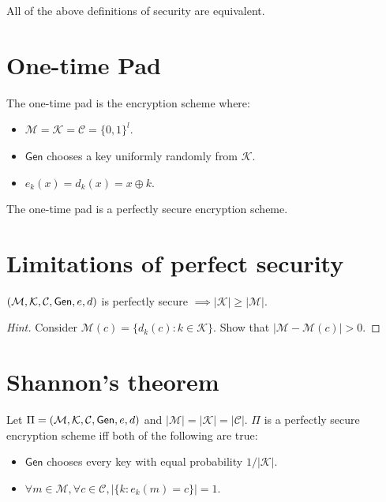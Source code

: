 \begin{theorem}All of the above definitions of security are equivalent.\end{theorem}

\section{One-time Pad}

The one-time pad is the encryption scheme where:
\begin{itemize}
\item $\mathcal{M} = \mathcal{K} = \mathcal{C} = \{0, 1\}^l$.
\item $\textsf{Gen}$ chooses a key uniformly randomly from $\mathcal{K}$.
\item $e_k(x) = d_k(x) = x \oplus k$.
\end{itemize}

\begin{theorem}The one-time pad is a perfectly secure encryption scheme.\end{theorem}

\section{Limitations of perfect security}

\begin{theorem}$(\mathcal{M}, \mathcal{K}, \mathcal{C}, \textsf{Gen}, e, d)$
is perfectly secure $\implies |\mathcal{K}| \ge |\mathcal{M}|$.\end{theorem}
\begin{proof}[Hint]Consider $\mathcal{M}(c) = \{d_k(c): k \in \mathcal{K}\}$.
Show that $|\mathcal{M} - \mathcal{M}(c)| > 0$.\end{proof}

\section{Shannon's theorem}

\begin{theorem}
Let $\Pi = (\mathcal{M}, \mathcal{K}, \mathcal{C}, \textsf{Gen}, e, d)$ and $|\mathcal{M}| = |\mathcal{K}| = |\mathcal{C}|$.
$\Pi$ is a perfectly secure encryption scheme iff both of the following are true:
\begin{itemize}
\item $\textsf{Gen}$ chooses every key with equal probability $1/|\mathcal{K}|$.
\item $\forall m \in \mathcal{M}, \forall c \in \mathcal{C}, |\{k: e_k(m) = c\}| = 1$.
\end{itemize}
\end{theorem}


